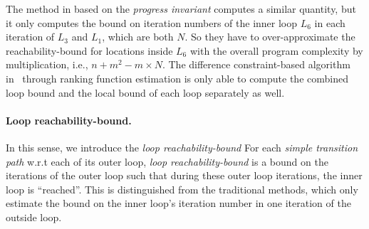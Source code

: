The method in \cite{GulwaniJK09} based on the \emph{progress invariant} computes a similar quantity, but it only computes
the
bound on iteration numbers
of the inner loop $L_6$ in each iteration of $L_3$ and $L_1$, which are both $N$.
So they have to over-approximate the reachability-bound for locations inside $L_6$ with the
overall program complexity by multiplication, i.e., $n + m^2 - m \times N$.
The difference constraint-based algorithm in~\cite{SinnZV17} through ranking function estimation
is only able to
compute the combined loop bound and the local bound of each loop
separately as well.

\paragraph{Loop reachability-bound.}
In this sense, we introduce the \emph{loop reachability-bound}
For each \emph{simple transition path}  w.r.t each of its outer loop,
\emph{loop reachability-bound}
is a bound on the iterations of
the outer loop
such that during these outer loop iterations, the inner loop is ``reached''. 
This is distinguished from the traditional methods, which only estimate the bound on the inner loop's iteration number
in one iteration of the outside loop.


